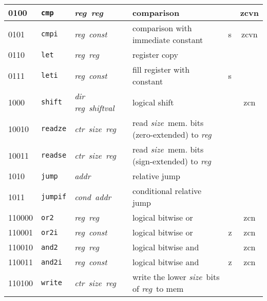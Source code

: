 \documentclass[architecture]{compas2018}
\newcommand{\reg}{\textit{reg}}
\newcommand{\const}{\textit{const}}
\newcommand{\shiftval}{\textit{shiftval}}
\newcommand{\cond}{\textit{cond}}
\newcommand{\ctr}{\textit{ctr}}
\newcommand{\size}{\textit{size}}
\newcommand{\addr}{\textit{addr}}
\begin{document}
\begin{table}[!h]
\begin{center}
\begin{tabular}{|l|l|l|l|l|c|}
    \hline
    0100    & \texttt{cmp}    & \reg\ \reg\                   & comparison                                           &      & zcvn        \\
    \hline
    0101    & \texttt{cmpi}   & \reg\ \const\                 & comparison with immediate constant                   & s    & zcvn        \\
    \hline
    0110    & \texttt{let}    & \reg\ \reg\                   & register copy                                        &      &             \\
    \hline
    0111    & \texttt{leti}   & \reg\ \const\                 & fill register with constant                          & s    &             \\
    \hline
    1000    & \texttt{shift}  & \textit{dir} \reg\ \shiftval\ & logical shift                                        &      & zcn         \\
    \hline
    10010   & \texttt{readze} & \ctr\ \size\ \reg\            & read \size\ mem. bits (zero-extended) to \reg\     &      &             \\
    10011   & \texttt{readse} & \ctr\ \size\ \reg\            & read \size\ mem. bits (sign-extended) to \reg\     &      &             \\
    \hline
    1010    & \texttt{jump}   & \addr\                        & relative jump                                        &      &             \\
    \hline
    1011    & \texttt{jumpif} & \cond\ \addr\                 & conditional relative jump                            &      &             \\
    \hline
    110000  & \texttt{or2}    & \reg\ \reg\                   & logical bitwise or                                   &      & zcn         \\
    \hline
    110001  & \texttt{or2i}   & \reg\ \const\                 & logical bitwise or                                   & {z}  & zcn         \\
    \hline
    110010  & \texttt{and2}   & \reg\ \reg\                   & logical bitwise and                                  &      & zcn         \\
    \hline
    110011  & \texttt{and2i}  & \reg\ \const\                 & logical bitwise and                                  & {z}  & zcn         \\
    \hline
    110100  & \texttt{write}  & \ctr\ \size\ \reg\            & write the lower \size\ bits of \reg\ to mem          &      &             \\

\end{tabular}
\end{center}
\end{table}
\end{document}
